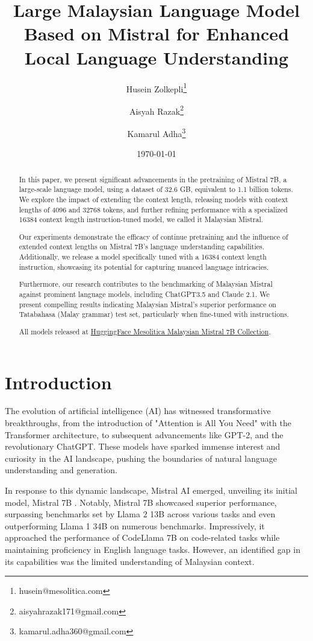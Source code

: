 \documentclass{article}
\title{Large Malaysian Language Model Based on Mistral for Enhanced Local Language Understanding}
\author{
  Husein Zolkepli\thanks{husein@mesolitica.com} \and 
  Aisyah Razak\thanks{aisyahrazak171@gmail.com} \and
  Kamarul Adha\thanks{kamarul.adha360@gmail.com}
}
\date{\today}
\begin{document}
\maketitle

\begin{abstract}
  In this paper, we present significant advancements in the pretraining of Mistral 7B, a large-scale language model, using a dataset of 32.6 GB, equivalent to 1.1 billion tokens. We explore the impact of extending the context length, releasing models with context lengths of 4096 and 32768 tokens, and further refining performance with a specialized 16384 context length instruction-tuned model, we called it Malaysian Mistral.

  Our experiments demonstrate the efficacy of continue pretraining and the influence of extended context lengths on Mistral 7B's language understanding capabilities. Additionally, we release a model specifically tuned with a 16384 context length instruction, showcasing its potential for capturing nuanced language intricacies.

  Furthermore, our research contributes to the benchmarking of Malaysian Mistral against prominent language models, including ChatGPT3.5 and Claude 2.1. We present compelling results indicating Malaysian Mistral's superior performance on Tatabahasa (Malay grammar) test set, particularly when fine-tuned with instructions.

  All models released at \href{https://huggingface.co/collections/mesolitica/malaysian-mistral-7b-6528f2ec825f4bba46c1700c}{HuggingFace Mesolitica Malaysian Mistral 7B Collection}.
\end{abstract}

\section{Introduction}
The evolution of artificial intelligence (AI) has witnessed transformative breakthroughs, from the introduction of "Attention is All You Need" \cite{vaswani2023attention} with the Transformer architecture, to subsequent advancements like GPT-2, and the revolutionary ChatGPT. These models have sparked immense interest and curiosity in the AI landscape, pushing the boundaries of natural language understanding and generation.

In response to this dynamic landscape, Mistral AI emerged, unveiling its initial model, Mistral 7B \cite{jiang2023mistral}. Notably, Mistral 7B showcased superior performance, surpassing benchmarks set by Llama 2 13B across various tasks and even outperforming Llama 1 34B on numerous benchmarks. Impressively, it approached the performance of CodeLlama 7B on code-related tasks while maintaining proficiency in English language tasks. However, an identified gap in its capabilities was the limited understanding of Malaysian context.
\end{document}
